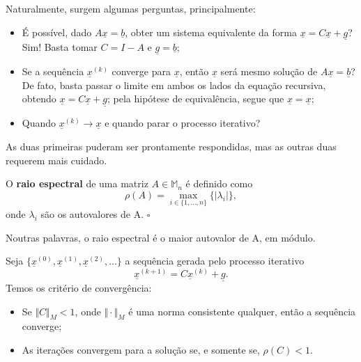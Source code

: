 \documentclass[../numerical_methods.tex]{subfiles}
\begin{document}
Naturalmente, surgem algumas perguntas, principalmente:
\begin{itemize}
	\item É possível, dado \(A\underline{x}= \underline{b}\), obter um sistema equivalente da forma \(\underline{x} = C\underline{x} + \underline{g}\)? Sim! Basta tomar \(C = I-A \) e \(\underline{g} = \underline{b}\);
	\item Se a sequência \(\underline{x}^{(k)}\) converge para \(\underline{x}\), então \(\underline{x}\) será mesmo solução de \(A\underline{x} = \underline{b}\)? De fato, basta passar o limite em ambos os lados da equação recursiva, obtendo \(\underline{x} = C \underline{x} + \underline{g}\); pela hipótese de equivalência, segue que \(\underline{x} = \underline{x}\);
	\item Quando \(\underline{x}^{(k)}\rightarrow \underline{x}\) e quando parar o processo iterativo?
\end{itemize}
As duas primeiras puderam ser prontamente respondidas, mas as outras duas requerem mais cuidado.

\begin{def*}
	O \textbf{raio espectral} de uma matriz \(A\in \mathbb{M}_{n}\) é definido como
	\[
		\rho (A) = \max\limits_{i\in \{1, \dotsc , n\}} \{| \lambda_{i} |\},
	\]
	onde \(\lambda_{i}\) são os autovalores de A. \(\square\)
\end{def*}
Noutras palavras, o raio espectral é o maior autovalor de A, em módulo.

\hypertarget{general_criterion}{
	\begin{theorem*}
		Seja \(\{\underline{x}^{(0)}, \underline{x}^{(1)}, \underline{x}^{(2)}, \dotsc \}\) a sequência gerada pelo processo iterativo
		\[
			\underline{x}^{(k+1)} = C \underline{x}^{(k)} + \underline{g}.
		\]
		Temos os critério de convergência:
		\begin{itemize}
			\item[1)] Se \(\Vert C \Vert_{M} < 1\), onde \(\Vert \cdot  \Vert_{M}\) é uma norma consistente qualquer, então a sequência converge;
			\item[2)] As iterações convergem para a solução se, e somente se, \(\rho (C) < 1\).
		\end{itemize}
	\end{theorem*}
}
\end{document}
